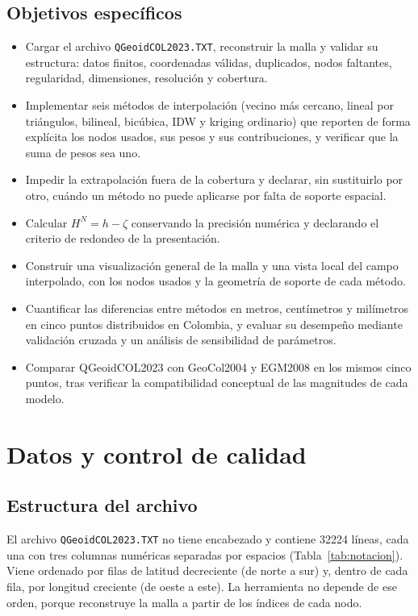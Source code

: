 \documentclass[11pt,letterpaper]{article}
\begin{document}
\subsection{Objetivos específicos}
\begin{itemize}
    \item Cargar el archivo \texttt{QGeoidCOL2023.TXT}, reconstruir la malla y validar su
    estructura: datos finitos, coordenadas válidas, duplicados, nodos faltantes,
    regularidad, dimensiones, resolución y cobertura.
    \item Implementar seis métodos de interpolación (vecino más cercano, lineal por
    triángulos, bilineal, bicúbica, IDW y kriging ordinario) que reporten de forma explícita
    los nodos usados, sus pesos y sus contribuciones, y verificar que la suma de pesos sea uno.
    \item Impedir la extrapolación fuera de la cobertura y declarar, sin sustituirlo por
    otro, cuándo un método no puede aplicarse por falta de soporte espacial.
    \item Calcular $H^N=h-\zeta$ conservando la precisión numérica y declarando el criterio
    de redondeo de la presentación.
    \item Construir una visualización general de la malla y una vista local del campo
    interpolado, con los nodos usados y la geometría de soporte de cada método.
    \item Cuantificar las diferencias entre métodos en metros, centímetros y milímetros en
    cinco puntos distribuidos en Colombia, y evaluar su desempeño mediante validación
    cruzada y un análisis de sensibilidad de parámetros.
    \item Comparar QGeoidCOL2023 con GeoCol2004 y EGM2008 en los mismos cinco puntos, tras
    verificar la compatibilidad conceptual de las magnitudes de cada modelo.
\end{itemize}

\section{Datos y control de calidad}
\label{sec:datos}

\subsection{Estructura del archivo}
El archivo \texttt{QGeoidCOL2023.TXT} no tiene encabezado y contiene \num{32224} líneas,
cada una con tres columnas numéricas separadas por espacios (Tabla~\ref{tab:notacion}).
Viene ordenado por filas de latitud decreciente (de norte a sur) y, dentro de cada fila,
por longitud creciente (de oeste a este). La herramienta no depende de ese orden, porque
reconstruye la malla a partir de los índices de cada nodo.
\end{document}
